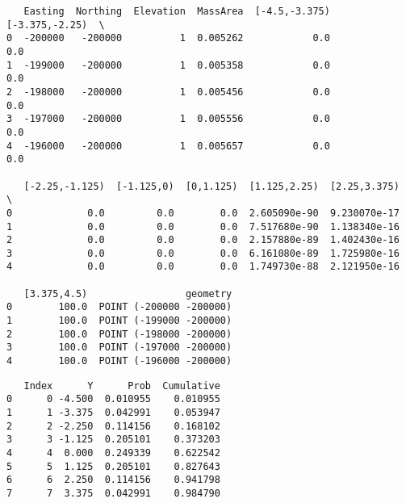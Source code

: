\documentclass[11pt]{article}
\begin{document}
    
    
    \begin{verbatim}
   Easting  Northing  Elevation  MassArea  [-4.5,-3.375)  [-3.375,-2.25)  \
0  -200000   -200000          1  0.005262            0.0             0.0   
1  -199000   -200000          1  0.005358            0.0             0.0   
2  -198000   -200000          1  0.005456            0.0             0.0   
3  -197000   -200000          1  0.005556            0.0             0.0   
4  -196000   -200000          1  0.005657            0.0             0.0   

   [-2.25,-1.125)  [-1.125,0)  [0,1.125)  [1.125,2.25)  [2.25,3.375)  \
0             0.0         0.0        0.0  2.605090e-90  9.230070e-17   
1             0.0         0.0        0.0  7.517680e-90  1.138340e-16   
2             0.0         0.0        0.0  2.157880e-89  1.402430e-16   
3             0.0         0.0        0.0  6.161080e-89  1.725980e-16   
4             0.0         0.0        0.0  1.749730e-88  2.121950e-16   

   [3.375,4.5)                 geometry  
0        100.0  POINT (-200000 -200000)  
1        100.0  POINT (-199000 -200000)  
2        100.0  POINT (-198000 -200000)  
3        100.0  POINT (-197000 -200000)  
4        100.0  POINT (-196000 -200000)  
    \end{verbatim}

    
    
    \begin{verbatim}
   Index      Y      Prob  Cumulative
0      0 -4.500  0.010955    0.010955
1      1 -3.375  0.042991    0.053947
2      2 -2.250  0.114156    0.168102
3      3 -1.125  0.205101    0.373203
4      4  0.000  0.249339    0.622542
5      5  1.125  0.205101    0.827643
6      6  2.250  0.114156    0.941798
7      7  3.375  0.042991    0.984790
    \end{verbatim}
\end{document}
